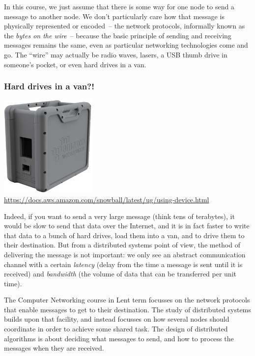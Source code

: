 In this course, we just assume that there is some way for one node to send a message to another node.
We don't particularly care how that message is physically represented or encoded~-- the network protocols, informally known as the \emph{bytes on the wire}~-- because the basic principle of sending and receiving messages remains the same, even as particular networking technologies come and go.
The ``wire'' may actually be radio waves, lasers, a USB thumb drive in someone's pocket, or even hard drives in a van.

\begin{frame}[plain]
    \label{s:snowball}
    \frametitle{Hard drives in a van?!}
    \begin{center}
        \includegraphics[height=5cm]{images/aws-snowball.png}\\[0.5em]
        \footnotesize{\url{https://docs.aws.amazon.com/snowball/latest/ug/using-device.html}}
    \end{center}
\end{frame}

Indeed, if you want to send a very large message (think tens of terabytes), it would be slow to send that data over the Internet, and it is in fact faster to write that data to a bunch of hard drives, load them into a van, and to drive them to their destination.
But from a distributed systems point of view, the method of delivering the message is not important: we only see an abstract communication channel with a certain \emph{latency} (delay from the time a message is sent until it is received) and \emph{bandwidth} (the volume of data that can be transferred per unit time).

The Computer Networking course in Lent term focusses on the network protocols that enable messages to get to their destination.
The study of distributed systems builds upon that facility, and instead focusses on how several nodes should coordinate in order to achieve some shared task.
The design of distributed algorithms is about deciding what messages to send, and how to process the messages when they are received.

